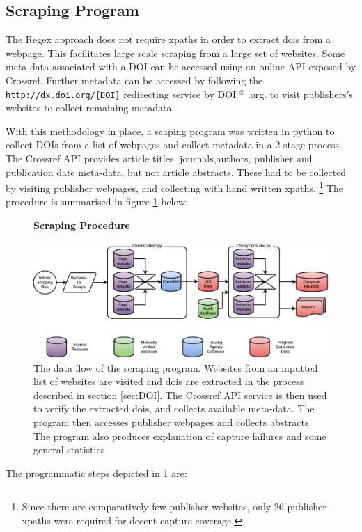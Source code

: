 \subsection{Scraping Program}
\label{sec:SCRAPING_PROGRAM}
The Regex approach does not require xpaths in order to extract dois from a webpage. This facilitates large scale scraping from a large set of websites. Some meta-data associated with a DOI can be accessed using an online API exposed by Crossref. Further metadata can be accessed by following the \texttt{http://dx.doi.org/\{DOI\}} redirecting service by DOI $^{\circledR}$ .org. to visit publishers's websites to collect remaining metadata. 

With this methodology in place, a scaping program was written in python to collect DOIs from a list of webpages and collect metadata in a 2 stage process. The Crossref API provides article titles, journals,authors, publisher and publication date meta-data, but not article abstracts. These had to be collected by visiting publisher webpages, and collecting with hand written xpaths. \footnote{Since there are comparatively few publisher websites, only 26 publisher xpaths were required for decent capture coverage.} The procedure is summarised in figure \ref{fig:Cherry} below:
\begin{figure}[H]
    \centering
    \textbf{Scraping Procedure}\par\medskip
    \includegraphics[width=\textwidth]{Data_Acquisition/Cherry.pdf}
    \caption{The data flow of the scraping program. Websites from an inputted list of websites are visited and dois are extracted in the process described in section \ref{sec:DOI}. The Crossref API service is then used to verify the extracted dois, and collects available meta-data. The program then accesses publisher webpages and collects abstracts. The program also produces explanation of capture failures and some general statistics}
     \label{fig:Cherry}
\end{figure}
The programmatic steps depicted in \ref{fig:Cherry} are:
